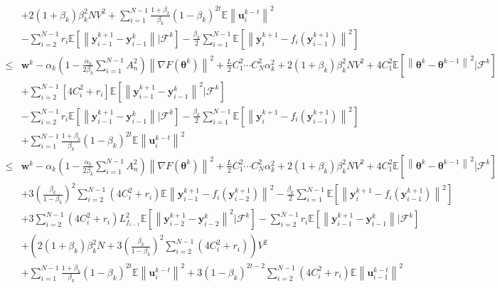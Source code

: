 \begin{equation*}
\begin{split}
&+2(1+\beta_k)\beta_k^2NV^2+\sum_{i=1}^{N-1}\frac{1+\beta_k}{\beta_k}\left ( 1-\beta_k \right )^{2t}\mathbb{E}\left \| \boldsymbol{u}_i^{k-t} \right \|^2\\
&-\sum_{i=2}^{N-1}r_i\mathbb{E}\left [ \left \| \boldsymbol{y}_{i-1}^{k+1}-\boldsymbol{y}_{i-1}^k \right \| |\mathcal{F}^k \right ]-\frac{\beta_k}{2}\sum_{i=1}^{N-1}\mathbb{E}\left [ \left \| \boldsymbol{y}_i^{k+1}-f_i(\boldsymbol{y}_{i-1}^{k+1}) \right \|^2 \right ]\\
\leq & \boldsymbol{w}^k-\alpha_k\left ( 1-\frac{\alpha_k}{2\beta_k}\sum_{i=1}^{N-1}A_n^2 \right )\left \| \nabla F\left ( \boldsymbol{\theta}^k \right ) \right \|^2+\frac{L}{2}C_1^2\cdots C_N^2\alpha_k^2+2(1+\beta_k)\beta_k^2NV^2+4C_1^2\mathbb{E}\left [ \left \| \boldsymbol{\theta}^k-\boldsymbol{\theta}^{k-1} \right \|^2|\mathcal{F}^k \right ]\\
&+\sum_{i=2}^{N-1}\left [ 4C_i^2+r_i \right ]\mathbb{E}\left [ \left \| \boldsymbol{y}_{i-1}^{k+1}-\boldsymbol{y}_{i-1}^{k} \right \|^2|\mathcal{F}^k \right ]\\
&-\sum_{i=2}^{N-1}r_i\mathbb{E}\left [ \left \| \boldsymbol{y}_{i-1}^{k+1}-\boldsymbol{y}_{i-1}^k \right \||\mathcal{F}^k \right ]-\frac{\beta_k}{2}\sum_{i=1}^{N-1}\mathbb{E}\left [ \left \| \boldsymbol{y}_i^{k+1}-f_i(\boldsymbol{y}_{i-1}^{k+1}) \right \|^2 \right ]\\
&+\sum_{i=1}^{N-1}\frac{1+\beta_k}{\beta_k}(1-\beta_k)^{2t}\mathbb{E}\left \| \boldsymbol{u}_i^{k-t} \right \|^2\\
\leq & \boldsymbol{w}^k-\alpha_k\left ( 1-\frac{\alpha_k}{2\beta_k}\sum_{i=1}^{N-1}A_n^2 \right )\left \| \nabla F\left ( \boldsymbol{\theta}^k \right ) \right \|^2+\frac{L}{2}C_1^2\cdots C_N^2\alpha_k^2+2(1+\beta_k)\beta_k^2NV^2+4C_1^2\mathbb{E}\left [ \left \| \boldsymbol{\theta}^k-\boldsymbol{\theta}^{k-1} \right \|^2|\mathcal{F}^k \right ]\\
&+3\left ( \frac{\beta_k}{1-\beta_k} \right )^2\sum_{i=2}^{N-1}\left ( 4C_i^2+r_i \right )
\mathbb{E}\left \| \boldsymbol{y}_{i-1}^{k+1}-f_i\left ( \boldsymbol{y}_{i-2}^{k+1} \right ) \right \|^2-\frac{\beta_k}{2}\sum_{i=1}^{N-1}\mathbb{E}\left [ \left \| \boldsymbol{y}_i^{k+1}-f_i\left ( \boldsymbol{y}_{i-1}^{k+1} \right ) \right \|^2 \right ]\\
&+3\sum_{i=2}^{N-1}\left ( 4C_i^2+r_i \right )L_{f_{i-1}}^2\mathbb{E}\left [ \left \| \boldsymbol{y}_{i-2}^{k+1}-\boldsymbol{y}_{i-2}^k \right \|^2|\mathcal{F}^k \right ]-\sum_{i=2}^{N-1}r_i\mathbb{E}\left [ \left \| \boldsymbol{y}_{i-1}^{k+1}-\boldsymbol{y}_{i-1}^k \right \||\mathcal{F}^k \right ]\\
&+\left ( 2\left ( 1+\beta_k \right )\beta_k^2N+3\left ( \frac{\beta_k}{1-\beta_k} \right )^2\sum_{i=2}^{N-1}\left ( 4C_i^2+r_i \right ) \right )V^2\\
&+\sum_{i=1}^{N-1}\frac{1+\beta_k}{\beta_k}\left ( 1-\beta_k \right )^{2t}\mathbb{E}\left \| \boldsymbol{u}_i^{k-t} \right \|^2+3\left ( 1-\beta_k \right )^{2t-2}\sum_{i=2}^{N-1}\left ( 4C_i^2+r_i \right )\mathbb{E}\left \| \boldsymbol{u}_{i-1}^{k-t} \right \|^2
\end{split}
\end{equation*}

